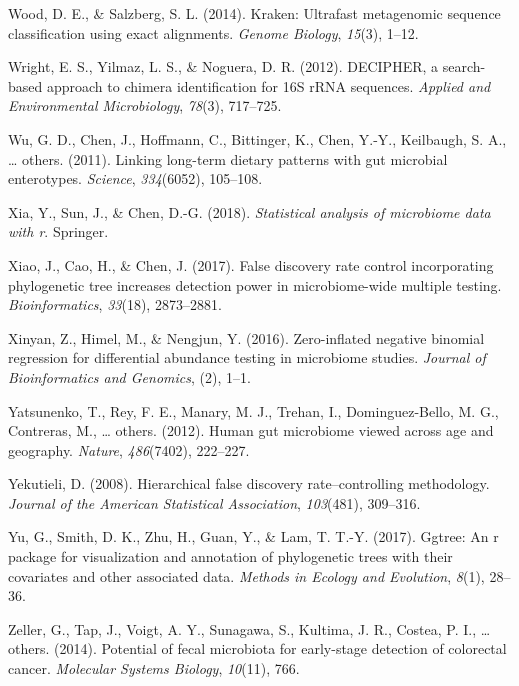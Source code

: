 \documentclass[12pt,a4paper]{reedthesis}
\theoremstyle{definition}
\theoremstyle{definition}
\theoremstyle{definition}
\theoremstyle{remark}
\begin{document}
\leavevmode\hypertarget{ref-wood2014kraken}{}%
Wood, D. E., \& Salzberg, S. L. (2014). Kraken: Ultrafast metagenomic sequence classification using exact alignments. \emph{Genome Biology}, \emph{15}(3), 1--12.

\leavevmode\hypertarget{ref-wright2012decipher}{}%
Wright, E. S., Yilmaz, L. S., \& Noguera, D. R. (2012). DECIPHER, a search-based approach to chimera identification for 16S rRNA sequences. \emph{Applied and Environmental Microbiology}, \emph{78}(3), 717--725.

\leavevmode\hypertarget{ref-wu2011linking}{}%
Wu, G. D., Chen, J., Hoffmann, C., Bittinger, K., Chen, Y.-Y., Keilbaugh, S. A., \ldots{} others. (2011). Linking long-term dietary patterns with gut microbial enterotypes. \emph{Science}, \emph{334}(6052), 105--108.

\leavevmode\hypertarget{ref-xia2018statistical}{}%
Xia, Y., Sun, J., \& Chen, D.-G. (2018). \emph{Statistical analysis of microbiome data with r}. Springer.

\leavevmode\hypertarget{ref-xiao2017false}{}%
Xiao, J., Cao, H., \& Chen, J. (2017). False discovery rate control incorporating phylogenetic tree increases detection power in microbiome-wide multiple testing. \emph{Bioinformatics}, \emph{33}(18), 2873--2881.

\leavevmode\hypertarget{ref-xinyan2016zero}{}%
Xinyan, Z., Himel, M., \& Nengjun, Y. (2016). Zero-inflated negative binomial regression for differential abundance testing in microbiome studies. \emph{Journal of Bioinformatics and Genomics}, (2), 1--1.

\leavevmode\hypertarget{ref-yatsunenko2012human}{}%
Yatsunenko, T., Rey, F. E., Manary, M. J., Trehan, I., Dominguez-Bello, M. G., Contreras, M., \ldots{} others. (2012). Human gut microbiome viewed across age and geography. \emph{Nature}, \emph{486}(7402), 222--227.

\leavevmode\hypertarget{ref-yekutieli2008hierarchical}{}%
Yekutieli, D. (2008). Hierarchical false discovery rate--controlling methodology. \emph{Journal of the American Statistical Association}, \emph{103}(481), 309--316.

\leavevmode\hypertarget{ref-yu2017ggtree}{}%
Yu, G., Smith, D. K., Zhu, H., Guan, Y., \& Lam, T. T.-Y. (2017). Ggtree: An r package for visualization and annotation of phylogenetic trees with their covariates and other associated data. \emph{Methods in Ecology and Evolution}, \emph{8}(1), 28--36.

\leavevmode\hypertarget{ref-zeller2014potential}{}%
Zeller, G., Tap, J., Voigt, A. Y., Sunagawa, S., Kultima, J. R., Costea, P. I., \ldots{} others. (2014). Potential of fecal microbiota for early-stage detection of colorectal cancer. \emph{Molecular Systems Biology}, \emph{10}(11), 766.
\end{document}

